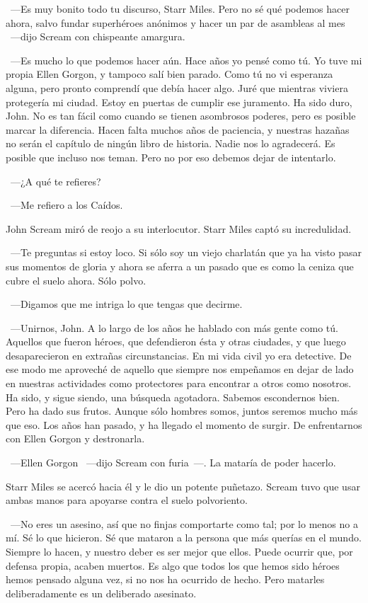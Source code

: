 ~---Es muy bonito todo tu discurso, Starr Miles. Pero no sé qué podemos hacer ahora, salvo fundar superhéroes anónimos y hacer un par de asambleas al mes ~---dijo Scream con chispeante amargura.

~---Es mucho lo que podemos hacer aún. Hace años yo pensé como tú. Yo tuve mi propia Ellen Gorgon, y tampoco salí bien parado. Como tú no vi esperanza alguna, pero pronto comprendí que debía hacer algo. Juré que mientras viviera protegería mi ciudad. Estoy en puertas de cumplir ese juramento. Ha sido duro, John. No es tan fácil como cuando se tienen asombrosos poderes, pero es posible marcar la diferencia. Hacen falta muchos años de paciencia, y nuestras hazañas no serán el capítulo de ningún libro de historia. Nadie nos lo agradecerá. Es posible que incluso nos teman. Pero no por eso debemos dejar de intentarlo.

~---¿A qué te refieres?

~---Me refiero a los Caídos.

John Scream miró de reojo a su interlocutor. Starr Miles captó su incredulidad.

~---Te preguntas si estoy loco. Si sólo soy un viejo charlatán que ya ha visto pasar sus momentos de gloria y ahora se aferra a un pasado que es como la ceniza que cubre el suelo ahora. Sólo polvo.

~---Digamos que me intriga lo que tengas que decirme.

~---Unirnos, John. A lo largo de los años he hablado con más gente como tú. Aquellos que fueron héroes, que defendieron ésta y otras ciudades, y que luego desaparecieron en extrañas circunstancias. En mi vida civil yo era detective. De ese modo me aproveché de aquello que siempre nos empeñamos en dejar de lado en nuestras actividades como protectores para encontrar a otros como nosotros. Ha sido, y sigue siendo, una búsqueda agotadora. Sabemos escondernos bien. Pero ha dado sus frutos. Aunque sólo hombres somos, juntos seremos mucho más que eso. Los años han pasado, y ha llegado el momento de surgir. De enfrentarnos con Ellen Gorgon y destronarla.

~---Ellen Gorgon ~---dijo Scream con furia~---. La mataría de poder hacerlo.

Starr Miles se acercó hacia él y le dio un potente puñetazo. Scream tuvo que usar ambas manos para apoyarse contra el suelo polvoriento.

~---No eres un asesino, así que no finjas comportarte como tal; por lo menos no a mí. Sé lo que hicieron. Sé que mataron a la persona que más querías en el mundo. Siempre lo hacen, y nuestro deber es ser mejor que ellos. Puede ocurrir que, por defensa propia, acaben muertos. Es algo que todos los que hemos sido héroes hemos pensado alguna vez, si no nos ha ocurrido de hecho. Pero matarles deliberadamente es un deliberado asesinato.

